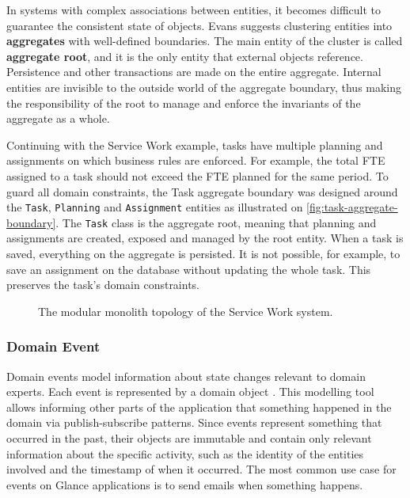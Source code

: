 In systems with complex associations between entities, it becomes difficult to guarantee the consistent state of objects. Evans \cite{ddd-blue-book} \cite{ddd-reference} suggests clustering entities into \textbf{aggregates} with well-defined boundaries. The main entity of the cluster is called \textbf{aggregate root}, and it is the only entity that external objects reference. Persistence and other transactions are made on the entire aggregate. Internal entities are invisible to the outside world of the aggregate boundary, thus making the responsibility of the root to manage and enforce the invariants of the aggregate as a whole.

Continuing with the Service Work example, tasks have multiple planning and assignments on which business rules are enforced. For example, the total FTE assigned to a task should not exceed the FTE planned for the same period. To guard all domain constraints, the Task aggregate boundary was designed around the \texttt{Task}, \texttt{Planning} and \texttt{Assignment} entities as illustrated on \autoref{fig:task-aggregate-boundary}. The \texttt{Task} class is the aggregate root, meaning that planning and assignments are created, exposed and managed by the root entity. When a task is saved, everything on the aggregate is persisted. It is not possible, for example, to save an assignment on the database without updating the whole task. This preserves the task's domain constraints. 

\begin{figure}[htbp]
  \centering
  
  \caption{The modular monolith topology of the Service Work system.}
  \label{fig:task-aggregate-boundary}
\end{figure}

\subsubsection{Domain Event}

Domain events model information about state changes relevant to domain experts. Each event is represented by a domain object \cite{ddd-reference} \cite{ddd-red-book}. This modelling tool allows informing other parts of the application that something happened in the domain via publish-subscribe patterns. Since events represent something that occurred in the past, their objects are immutable and contain only relevant information about the specific activity, such as the identity of the entities involved and the timestamp of when it occurred. The most common use case for events on Glance applications is to send emails when something happens.

